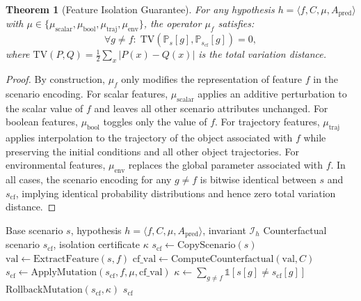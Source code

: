 \documentclass[journal]{IEEEtran}
\theoremstyle{plain}
\newtheorem{theorem}{Theorem}[section]
\theoremstyle{definition}
\theoremstyle{remark}
\newcommand{\ind}{\mathds{1}}
\newcommand{\Prob}{\mathbb{P}}
\begin{document}
\begin{theorem}[Feature Isolation Guarantee]\label{thm:isolation}
For any hypothesis $h = \langle f, C, \mu, A_{\text{pred}} \rangle$ with $\mu \in \{\mu_{\text{scalar}},\mu_{\text{bool}},\mu_{\text{traj}},\mu_{\text{env}}\}$, the operator $\mu_f$ satisfies:
\begin{equation}
\forall g \neq f: \; \text{TV}(\Prob_{s}[g], \Prob_{s_{\text{cf}}}[g]) = 0,
\label{eq:tv_isolation}
\end{equation}
where $\text{TV}(P,Q) = \frac{1}{2}\sum_x |P(x)-Q(x)|$ is the total variation distance.
\end{theorem}

\begin{proof}
By construction, $\mu_f$ only modifies the representation of feature $f$ in the scenario encoding. For scalar features, $\mu_{\text{scalar}}$ applies an additive perturbation to the scalar value of $f$ and leaves all other scenario attributes unchanged. For boolean features, $\mu_{\text{bool}}$ toggles only the value of $f$. For trajectory features, $\mu_{\text{traj}}$ applies interpolation to the trajectory of the object associated with $f$ while preserving the initial conditions and all other object trajectories. For environmental features, $\mu_{\text{env}}$ replaces the global parameter associated with $f$. In all cases, the scenario encoding for any $g \neq f$ is bitwise identical between $s$ and $s_{\text{cf}}$, implying identical probability distributions and hence zero total variation distance.
\end{proof}

\begin{algorithm}[t]
\caption{Counterfactual Mutation Design with Isolation Verification}
\label{alg:mutation}
\begin{algorithmic}[1]
\Require Base scenario $s$, hypothesis $h = \langle f, C, \mu, A_{\text{pred}} \rangle$, invariant $\mathcal{I}_h$
\Ensure Counterfactual scenario $s_{\text{cf}}$, isolation certificate $\kappa$
\State $s_{\text{cf}} \gets \text{CopyScenario}(s)$
\State $\text{val} \gets \text{ExtractFeature}(s, f)$
\State $\text{cf\_val} \gets \text{ComputeCounterfactual}(\text{val}, C)$
\State $s_{\text{cf}} \gets \text{ApplyMutation}(s_{\text{cf}}, f, \mu, \text{cf\_val})$
\State $\kappa \gets \sum_{g \neq f} \ind[s[g] \neq s_{\text{cf}}[g]]$ 
    \State $\text{RollbackMutation}(s_{\text{cf}}, \kappa)$
\EndIf
\State \Return $s_{\text{cf}}$
\end{algorithmic}
\end{algorithm}
\end{document}
